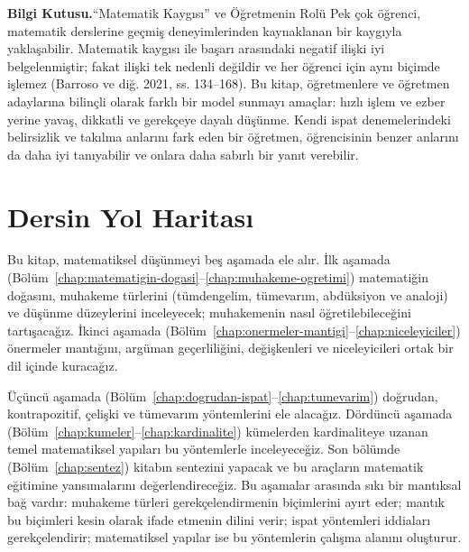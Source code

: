 \begin{tcolorbox}[bookbox,colback=cEx]\textbf{\textsf{\textcolor{cAcc}{Bilgi Kutusu.}}}\quad “Matematik Kaygısı” ve Öğretmenin Rolü Pek çok öğrenci, matematik derslerine geçmiş deneyimlerinden kaynaklanan bir kaygıyla yaklaşabilir. Matematik kaygısı ile başarı arasındaki negatif ilişki iyi belgelenmiştir; fakat ilişki tek nedenli değildir ve her öğrenci için aynı biçimde işlemez (Barroso ve diğ. 2021, ss. 134–168). Bu kitap, öğretmenlere ve öğretmen adaylarına bilinçli olarak farklı bir model sunmayı amaçlar: hızlı işlem ve ezber yerine yavaş, dikkatli ve gerekçeye dayalı düşünme. Kendi ispat denemelerindeki belirsizlik ve takılma anlarını fark eden bir öğretmen, öğrencisinin benzer anlarını da daha iyi tanıyabilir ve onlara daha sabırlı bir yanıt verebilir.\end{tcolorbox}

\section{Dersin Yol Haritası}

Bu kitap, matematiksel düşünmeyi beş aşamada ele alır. İlk aşamada (Bölüm~\ref{chap:matematigin-dogasi}--\ref{chap:muhakeme-ogretimi}) matematiğin doğasını, muhakeme türlerini (tümdengelim, tümevarım, abdüksiyon ve analoji) ve düşünme düzeylerini inceleyecek; muhakemenin nasıl öğretilebileceğini tartışacağız. İkinci aşamada (Bölüm~\ref{chap:onermeler-mantigi}--\ref{chap:niceleyiciler}) önermeler mantığını, argüman geçerliliğini, değişkenleri ve niceleyicileri ortak bir dil içinde kuracağız.

Üçüncü aşamada (Bölüm~\ref{chap:dogrudan-ispat}--\ref{chap:tumevarim}) doğrudan, kontrapozitif, çelişki ve tümevarım yöntemlerini ele alacağız. Dördüncü aşamada (Bölüm~\ref{chap:kumeler}--\ref{chap:kardinalite}) kümelerden kardinaliteye uzanan temel matematiksel yapıları bu yöntemlerle inceleyeceğiz. Son bölümde (Bölüm~\ref{chap:sentez}) kitabın sentezini yapacak ve bu araçların matematik eğitimine yansımalarını değerlendireceğiz. Bu aşamalar arasında sıkı bir mantıksal bağ vardır: muhakeme türleri gerekçelendirmenin biçimlerini ayırt eder; mantık bu biçimleri kesin olarak ifade etmenin dilini verir; ispat yöntemleri iddiaları gerekçelendirir; matematiksel yapılar ise bu yöntemlerin çalışma alanını oluşturur.


